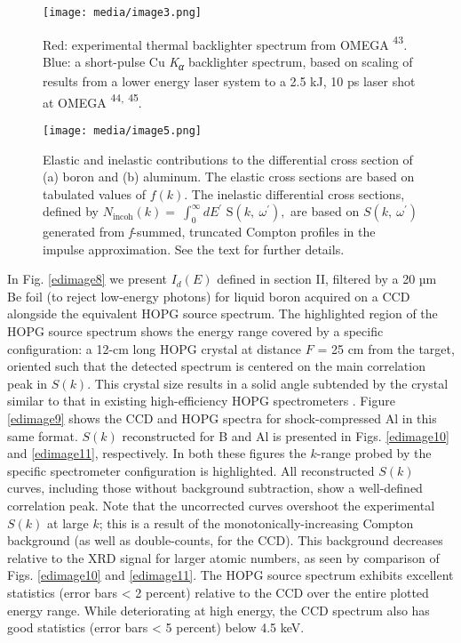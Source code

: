 \begin{figure}[h] 
\caption{ Red: experimental thermal
backlighter spectrum from OMEGA
{\textsuperscript{43}}\emph{.}
Blue: a short-pulse Cu \emph{K\textsubscript{α}} backlighter spectrum,
based on scaling of results from a lower energy laser system to a 2.5
kJ, 10 ps laser shot at OMEGA
{\textsuperscript{44}}\textsuperscript{,}
{\textsuperscript{45}}{}.}
\label{edimage3}
\centering
\texttt{[image: media/image3.png]}
\end{figure}

\begin{figure}[!ht] 
\caption{ Elastic and inelastic contributions to the differential cross
section of (a) boron and (b) aluminum. The elastic cross sections are
based on tabulated values of \(f(k)\). The inelastic differential cross
sections, defined by
\(N_{\text{incoh}}\left( k \right) = \ \int_{0}^{\infty}{dE^{'}}\text{\ S}\left( k,\ \omega^{'} \right),\)
are based on \(S\left( k,\ \omega^{'} \right)\) generated from
\emph{f}-summed, truncated Compton profiles in the impulse
approximation. See the text for further details.}
\label{edimage5}
\centering
\texttt{[image: media/image5.png]}
\end{figure}



In Fig. \ref{edimage8} we present \(I_{d}\left( E \right)\) defined in section II,
filtered by a 20 µm Be foil (to reject low-energy photons) for liquid
boron acquired on a CCD alongside the equivalent HOPG source spectrum.
The highlighted region of the HOPG source spectrum shows the energy
range covered by a specific configuration: a 12-cm long HOPG crystal at
distance \(F\) = 25 cm from the target, oriented such that the detected
spectrum is centered on the main correlation peak in \(S(k)\). This
crystal size results in a solid angle subtended by the crystal similar
to that in existing high-efficiency HOPG spectrometers
 \cite{PAK2004X}.
Figure \ref{edimage9} shows the CCD and HOPG spectra for shock-compressed Al in this
same format. \(S\left( k \right)\) reconstructed for B and Al is
presented in Figs. \ref{edimage10} and \ref{edimage11}, respectively. In both these figures the
\(k\)-range probed by the specific spectrometer configuration is
highlighted. All reconstructed \(S\left( k \right)\) curves, including
those without background subtraction, show a well-defined correlation
peak. Note that the uncorrected curves overshoot the experimental
\(S\left( k \right)\) at large \(k\); this is a result of the
monotonically-increasing Compton background (as well as double-counts,
for the CCD). This background decreases relative to the XRD signal for
larger atomic numbers, as seen by comparison of Figs. \ref{edimage10} and \ref{edimage11}. The
HOPG source spectrum exhibits excellent statistics (error bars
\textless{} 2 percent) relative to the CCD over the entire plotted
energy range. While deteriorating at high energy, the CCD spectrum also
has good statistics (error bars \textless{} 5 percent) below 4.5 keV.

